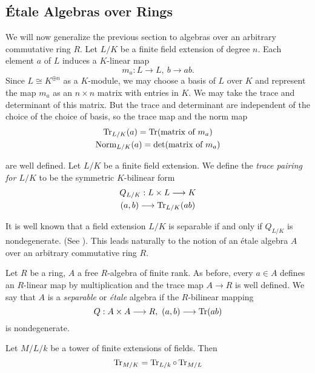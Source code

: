 \subsection{\'Etale Algebras over Rings}
We will now generalize the previous section to algebras over an arbitrary commutative ring $R$. Let $L/K$ be a finite field extension of degree $n$. Each element $a$ of $L$ induces a $K$-linear map
\[
	m_a: L \to L,\ b \to ab.
\]
Since $L \cong K^{\oplus n}$ as a $K$-module, we may choose a basis of $L$ over $K$ and represent the map $m_a$ as an $n \times n$ matrix with entries in $K$. We may take the trace and determinant of this matrix. But the trace and determinant are independent of the choice of the choice of basis, so the trace map and the norm map
\begin{gather*}
	\operatorname{Tr}_{L/K}(a) = \operatorname{Tr}(\text{matrix of }m_a)\\
	\operatorname{Norm}_{L/K}(a) = \text{det}(\text{matrix of }m_a)
\end{gather*}

are well defined. Let $L/K$ be a finite field extension. We define the \textit{trace pairing for $L/K$} to be the symmetric $K$-bilinear form
\begin{gather*}
	Q_{L/K} : L \times L \longrightarrow K\\
	(a,b) \longrightarrow \operatorname{Tr}_{L/K}(ab)
\end{gather*}

It is well known that a field extension $L/K$ is separable if and only if $Q_{L/K}$ is nondegenerate. (See \cite{konradSep}). This leads naturally to the notion of an \'etale algebra $A$ over an arbitrary commutative ring $R$.

\begin{definition}
	Let $R$ be a ring, $A$ a free $R$-algebra of finite rank. As before, every $a \in A$ defines an $R$-linear map by multiplication and the trace map $A \to R$ is well defined. We say that $A$ is a \textit{separable} or \textit{\'etale} algebra if the $R$-bilinear mapping
	\[
		Q : A \times A \longrightarrow R,\ (a,b) \longrightarrow \operatorname{Tr}(ab)
	\]
	is nondegenerate.
\end{definition}

\begin{lemma}
	Let $M/L/k$ be a tower of finite extensions of fields. Then
	\[
		\operatorname{Tr}_{M/K} = \operatorname{Tr}_{L/k} \circ \operatorname{Tr}_{M/L}
	\]
\end{lemma}

